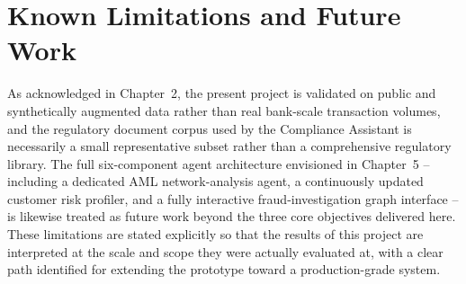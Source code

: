 \section{Known Limitations and Future Work}

As acknowledged in Chapter~2, the present project is validated on public and synthetically augmented data rather than real bank-scale transaction volumes, and the regulatory document corpus used by the Compliance Assistant is necessarily a small representative subset rather than a comprehensive regulatory library. The full six-component agent architecture envisioned in Chapter~5 -- including a dedicated AML network-analysis agent, a continuously updated customer risk profiler, and a fully interactive fraud-investigation graph interface -- is likewise treated as future work beyond the three core objectives delivered here. These limitations are stated explicitly so that the results of this project are interpreted at the scale and scope they were actually evaluated at, with a clear path identified for extending the prototype toward a production-grade system.
